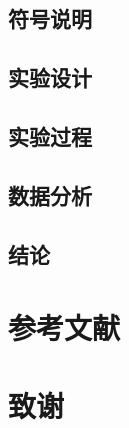 \documentclass[UTF8,12pt]{hue}
\begin{document}
	
	\begin{center}\item\section{符号说明}\end{center}
	
	\begin{center}\item\section{实验设计}\end{center}
	
	\begin{center}\item\section{实验过程}\end{center}
	
	\begin{center}\item\section{数据分析}\end{center}
	
	\begin{center}\item\section{结论}\end{center}
	
	\newpage\noindent\section*{参考文献}
	
	
	\newpage\noindent\section*{致谢}
\end{document}
